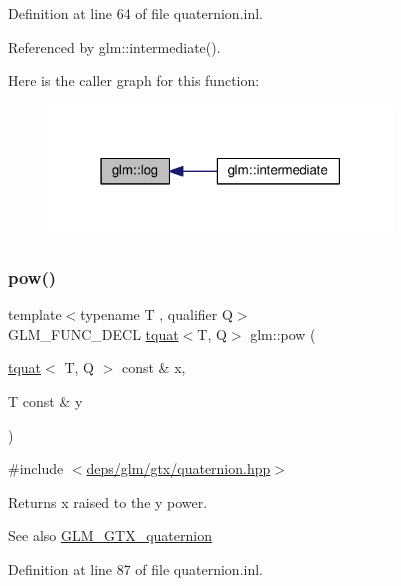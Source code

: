 Definition at line 64 of file quaternion.\+inl.



Referenced by glm\+::intermediate().

Here is the caller graph for this function\+:
\nopagebreak
\begin{figure}[H]
\begin{center}
\leavevmode
\includegraphics[width=259pt]{d8/db2/group__gtx__quaternion_gaad510f1a4ea26994b341c094ec4f4eed_icgraph}
\end{center}
\end{figure}
\mbox{\label{group__gtx__quaternion_gad382fc37392d537aecf2245a4597d8a3}} 
\subsubsection{\texorpdfstring{pow()}{pow()}}
{\footnotesize\ttfamily template$<$typename T , qualifier Q$>$ \\
G\+L\+M\+\_\+\+F\+U\+N\+C\+\_\+\+D\+E\+CL \hyperlink{structglm_1_1tquat}{tquat}$<$T, Q$>$ glm\+::pow (\begin{DoxyParamCaption}\item[{\hyperlink{structglm_1_1tquat}{tquat}$<$ T, Q $>$ const \&}]{x,  }\item[{T const \&}]{y }\end{DoxyParamCaption})}



{\ttfamily \#include $<$\hyperlink{gtx_2quaternion_8hpp}{deps/glm/gtx/quaternion.\+hpp}$>$}

Returns x raised to the y power.

\begin{DoxySeeAlso}{See also}
\hyperlink{group__gtx__quaternion}{G\+L\+M\+\_\+\+G\+T\+X\+\_\+quaternion} 
\end{DoxySeeAlso}


Definition at line 87 of file quaternion.\+inl.

